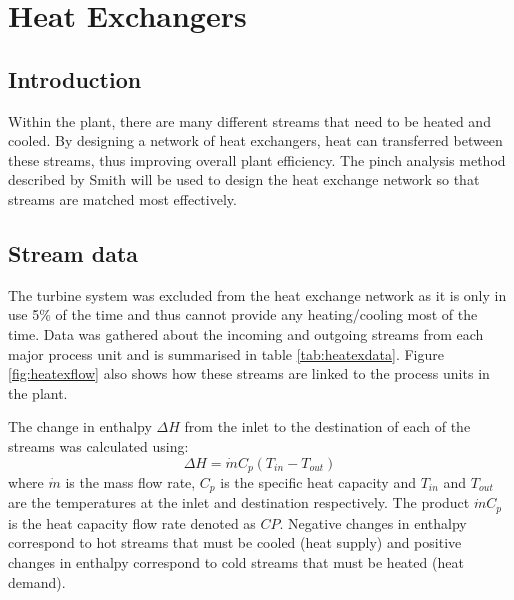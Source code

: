 
\usepackage{style-3yp} %

\usepackage{wrapfig}
\usepackage{float}
\usepackage{array}
\usepackage{multirow}

%

\section{Heat Exchangers}
\subsection{Introduction}

Within the plant, there are many different streams that need to be heated and cooled. By designing a network of heat exchangers, heat can transferred between these streams, thus improving overall plant efficiency. The pinch analysis method described by Smith \cite{hexbook} \cite{lecture:hex} will be used to design the heat exchange network so that streams are matched most effectively. 

\subsection{Stream data}
The turbine system was excluded from the heat exchange network as it is only in use 5\% of the time and thus cannot provide any heating/cooling most of the time. Data was gathered about the incoming and outgoing streams from each major process unit and is summarised in table \ref{tab:heatexdata}. Figure \ref{fig:heatexflow} also shows how these streams are linked to the process units in the plant.

The change in enthalpy $\Delta H$ from the inlet to the destination of each of the streams was calculated using:
\begin{equation} \label{eq:heatex}
\Delta H = \dot{m} C_p (T_{in} - T_{out})
\end{equation}
where $\dot{m}$ is the mass flow rate, $C_p$ is the specific heat capacity and $T_{in}$ and $T_{out}$ are the temperatures at the inlet and destination respectively. The product $\dot{m} C_p$ is the heat capacity flow rate denoted as $CP$. Negative changes in enthalpy correspond to hot streams that must be cooled (heat supply) and positive changes in enthalpy correspond to cold streams that must be heated (heat demand).

